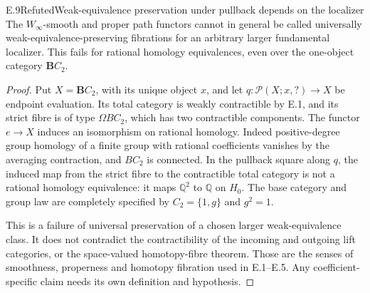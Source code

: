 \begin{result}{E.9}{Refuted}{Weak-equivalence preservation under pullback depends on the localizer}
The $W_\infty$-smooth and proper path functors cannot in general be called universally weak-equivalence-preserving fibrations for an arbitrary larger fundamental localizer. This fails for rational homology equivalences, even over the one-object category $\mathbf B C_2$.
\end{result}
\begin{proof}
Put $X=\mathbf B C_2$, with its unique object $x$, and let $q:\mathcal P(X;x,?)\to X$ be endpoint evaluation. Its total category is weakly contractible by E.1, and its strict fibre is of type $\Omega BC_2$, which has two contractible components. The functor $e\to X$ induces an isomorphism on rational homology. Indeed positive-degree group homology of a finite group with rational coefficients vanishes by the averaging contraction, and $BC_2$ is connected. In the pullback square along $q$, the induced map from the strict fibre to the contractible total category is not a rational homology equivalence: it maps $\mathbb Q^2$ to $\mathbb Q$ on $H_0$. The base category and group law are completely specified by $C_2=\{1,g\}$ and $g^2=1$.

This is a failure of universal preservation of a chosen larger weak-equivalence class. It does not contradict the contractibility of the incoming and outgoing lift categories, or the space-valued homotopy-fibre theorem. Those are the senses of smoothness, properness and homotopy fibration used in E.1--E.5. Any coefficient-specific claim needs its own definition and hypothesis.
\end{proof}

